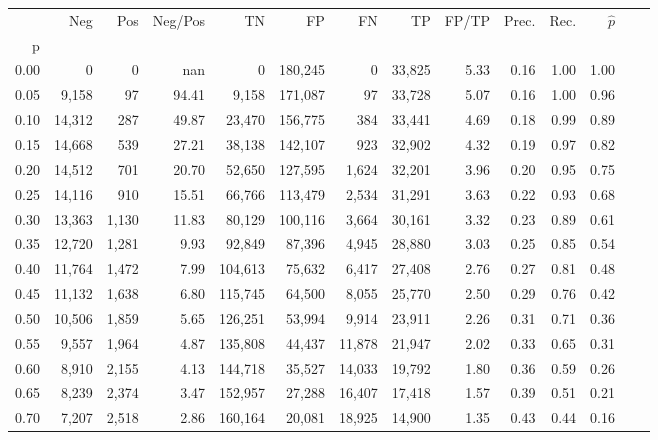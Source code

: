 \begin{tabular}{rrrrrrrrrrrrrr}
\toprule
{} &     Neg &    Pos & Neg/Pos &       TN &       FP &      FN &      TP & FP/TP & Prec. &  Rec. & $\hat{p}$ \\
p    &         &        &         &          &          &         &         &       &       &       &           \\
\midrule
0.00 &       0 &      0 &     nan &        0 &  180,245 &       0 &  33,825 &  5.33 &  0.16 &  1.00 &      1.00 \\
0.05 &   9,158 &     97 &   94.41 &    9,158 &  171,087 &      97 &  33,728 &  5.07 &  0.16 &  1.00 &      0.96 \\
0.10 &  14,312 &    287 &   49.87 &   23,470 &  156,775 &     384 &  33,441 &  4.69 &  0.18 &  0.99 &      0.89 \\
0.15 &  14,668 &    539 &   27.21 &   38,138 &  142,107 &     923 &  32,902 &  4.32 &  0.19 &  0.97 &      0.82 \\
0.20 &  14,512 &    701 &   20.70 &   52,650 &  127,595 &   1,624 &  32,201 &  3.96 &  0.20 &  0.95 &      0.75 \\
0.25 &  14,116 &    910 &   15.51 &   66,766 &  113,479 &   2,534 &  31,291 &  3.63 &  0.22 &  0.93 &      0.68 \\
0.30 &  13,363 &  1,130 &   11.83 &   80,129 &  100,116 &   3,664 &  30,161 &  3.32 &  0.23 &  0.89 &      0.61 \\
0.35 &  12,720 &  1,281 &    9.93 &   92,849 &   87,396 &   4,945 &  28,880 &  3.03 &  0.25 &  0.85 &      0.54 \\
0.40 &  11,764 &  1,472 &    7.99 &  104,613 &   75,632 &   6,417 &  27,408 &  2.76 &  0.27 &  0.81 &      0.48 \\
0.45 &  11,132 &  1,638 &    6.80 &  115,745 &   64,500 &   8,055 &  25,770 &  2.50 &  0.29 &  0.76 &      0.42 \\
0.50 &  10,506 &  1,859 &    5.65 &  126,251 &   53,994 &   9,914 &  23,911 &  2.26 &  0.31 &  0.71 &      0.36 \\
0.55 &   9,557 &  1,964 &    4.87 &  135,808 &   44,437 &  11,878 &  21,947 &  2.02 &  0.33 &  0.65 &      0.31 \\
0.60 &   8,910 &  2,155 &    4.13 &  144,718 &   35,527 &  14,033 &  19,792 &  1.80 &  0.36 &  0.59 &      0.26 \\
0.65 &   8,239 &  2,374 &    3.47 &  152,957 &   27,288 &  16,407 &  17,418 &  1.57 &  0.39 &  0.51 &      0.21 \\
0.70 &   7,207 &  2,518 &    2.86 &  160,164 &   20,081 &  18,925 &  14,900 &  1.35 &  0.43 &  0.44 &      0.16 \\

\end{tabular}
